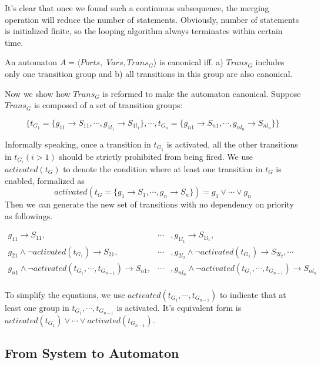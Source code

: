 It's clear that once we found such a continuous subsequence, the merging operation will reduce the number of statements. Obviously, number of statements is initialized finite, so the looping algorithm always terminates within certain time.

\begin{definition}
    An automaton $A=\langle Ports,$ $Vars,Trans_G\rangle$ is canonical iff. a) $Trans_G$ includes only one transition group and b) all transitions in this group are also canonical.
\end{definition}

Now we show how $Trans_G$ is reformed to make the automaton canonical.
Suppose $Trans_G$ is composed of a set of transition groups:
\begin{small}
\[
    \{t_{G_1}=\{g_{11}\rightarrow S_{11},\cdots, g_{1l_1}\rightarrow S_{1l_1}\},\cdots,t_{G_n}=\{g_{n1}\rightarrow S_{n1},\cdots,g_{nl_n}\rightarrow S_{nl_n}\}\}
\]
\end{small}

Informally speaking, once a transition in $t_{G_1}$ is activated, all the other transitions in $t_{G_i}(i>1)$ should be strictly prohibited from being fired. We use $activated(t_G)$ to denote the condition where at least one transition in $t_G$ is enabled, formalized as
\[
    activated(t_G=\{g_1\rightarrow S_1,\cdots, g_n\rightarrow S_n\}) = g_1\lor\cdots\lor g_n
\]
Then we can generate the new set of transitions with no dependency on priority as followings.
\begin{small}
\begin{eqnarray*}
    g_{11}\rightarrow S_{11},&\cdots&,g_{1l_1}\rightarrow S_{1l_1}, \\
    g_{21}\land \lnot activated(t_{G_1})\rightarrow S_{21}, &\cdots&, g_{2l_2} \land \lnot activated(t_{G_1})\rightarrow S_{2l_2}, \cdots \\
    g_{n1}\land \lnot activated(t_{G_1},\cdots,t_{G_{n-1}})\rightarrow S_{n1}, &\cdots&, g_{nl_n} \land \lnot activated(t_{G_1},\cdots,t_{G_{n-1}})\rightarrow S_{nl_n} \\
\end{eqnarray*}
\end{small}
To simplify the equations, we use $activated(t_{G_1},\cdots,t_{G_{n-1}})$ to indicate that at least one group in $t_{G_1},\cdots,t_{G_{n-1}}$ is activated. It's equivalent form is $activated(t_{G_1})\lor\cdots\lor activated(t_{G_{n-1}})$. 
\subsection{From System to Automaton}
\label{subsec:composition}

